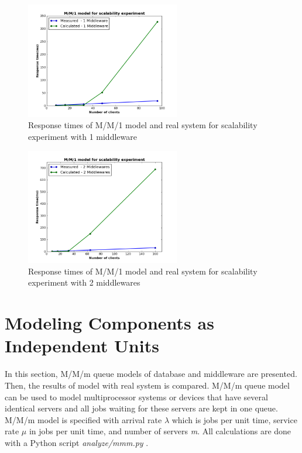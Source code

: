 \documentclass[11pt]{article}
\begin{document}
\begin{figure}[H]
  \includegraphics[width=0.6\textwidth,page=1]{figures/mm1/scalability-new/mm1-scalability-1}
  \centering
  \caption{Response times of M/M/1 model and real system for scalability experiment with 1 middleware}
  \label{fig:mm1-scalability-1}
\end{figure}

\begin{figure}[H]
  \includegraphics[width=0.6\textwidth,page=1]{figures/mm1/scalability-new/mm1-scalability-2}
  \centering
  \caption{Response times of M/M/1 model and real system for scalability experiment with 2 middlewares}
  \label{fig:mm1-scalability-2}
\end{figure}

\section{Modeling Components as Independent Units}\label{sec:independent-units}

In this section, M/M/m queue models of database and middleware are presented. Then, the results of model 
with real system is compared. M/M/m queue model can be used to model multiprocessor systems or 
devices that have several identical servers and all jobs waiting for these servers are kept in one queue.
M/M/m model is specified with arrival rate $\lambda$ which is jobs per unit time, service rate 
$\mu$ in jobs per unit time, and number of servers \emph{m}. All calculations are done with a Python script 
\emph{analyze/mmm.py} . 
\end{document}
